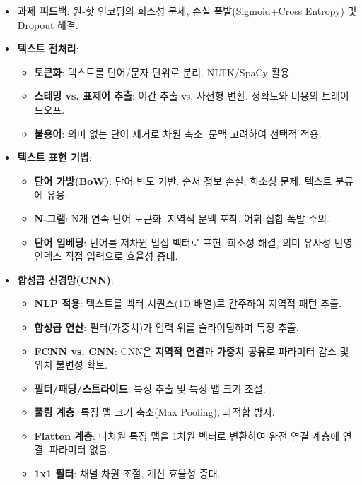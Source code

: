 \documentclass[11pt,a4paper]{article}
\begin{document}
\begin{tcolorbox}[colback=myblue!10!white, colframe=blue!75!black, title=\textbf{CSCI89 Lecture 4 핵심 요약}, fonttitle=\bfseries\large, boxsep=5pt, left=5pt, right=5pt, top=5pt, bottom=5pt, arc=5mm, auto outer arc]

\begin{itemize}
    \item[] \textbf{과제 피드백}: 원-핫 인코딩의 희소성 문제, 손실 폭발(Sigmoid+Cross Entropy) 및 Dropout 해결.
    \item[] \textbf{텍스트 전처리}:
    \begin{itemize}
        \item \textbf{토큰화}: 텍스트를 단어/문자 단위로 분리. NLTK/SpaCy 활용.
        \item \textbf{스테밍 vs. 표제어 추출}: 어간 추출 vs. 사전형 변환. 정확도와 비용의 트레이드오프.
        \item \textbf{불용어}: 의미 없는 단어 제거로 차원 축소. 문맥 고려하여 선택적 적용.
    \end{itemize}
    \item[] \textbf{텍스트 표현 기법}:
    \begin{itemize}
        \item \textbf{단어 가방(BoW)}: 단어 빈도 기반. 순서 정보 손실, 희소성 문제. 텍스트 분류에 유용.
        \item \textbf{N-그램}: N개 연속 단어 토큰화. 지역적 문맥 포착. 어휘 집합 폭발 주의.
        \item \textbf{단어 임베딩}: 단어를 저차원 밀집 벡터로 표현. 희소성 해결, 의미 유사성 반영. 인덱스 직접 입력으로 효율성 증대.
    \end{itemize}
    \item[] \textbf{합성곱 신경망(CNN)}:
    \begin{itemize}
        \item \textbf{NLP 적용}: 텍스트를 벡터 시퀀스(1D 배열)로 간주하여 지역적 패턴 추출.
        \item \textbf{합성곱 연산}: 필터(가중치)가 입력 위를 슬라이딩하며 특징 추출.
        \item \textbf{FCNN vs. CNN}: CNN은 \textbf{지역적 연결}과 \textbf{가중치 공유}로 파라미터 감소 및 위치 불변성 확보.
        \item \textbf{필터/패딩/스트라이드}: 특징 추출 및 특징 맵 크기 조절.
        \item \textbf{풀링 계층}: 특징 맵 크기 축소(Max Pooling), 과적합 방지.
        \item \textbf{Flatten 계층}: 다차원 특징 맵을 1차원 벡터로 변환하여 완전 연결 계층에 연결. 파라미터 없음.
        \item \textbf{1x1 필터}: 채널 차원 조절, 계산 효율성 증대.
    \end{itemize}
\end{itemize}
\end{tcolorbox}
\end{document}
